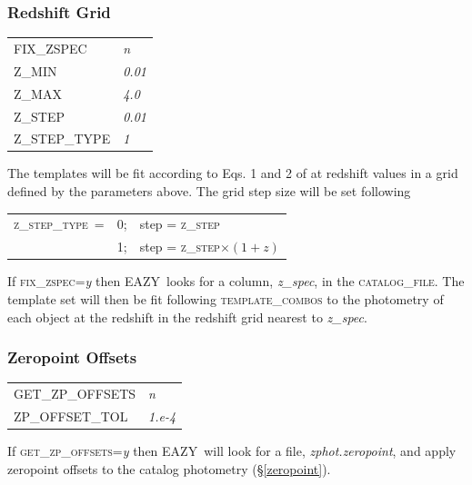 \documentclass[11pt]{article}
\newcommand{\eazy}{\textsc{EAZY}}
\begin{document}
\subsubsection{Redshift Grid}
\begin{tabular}{ll}
 \textsc{FIX\_ZSPEC     } & \textsl{       n                  } \\
 \textsc{Z\_MIN         } & \textsl{       0.01               } \\
 \textsc{Z\_MAX         } & \textsl{       4.0                } \\
 \textsc{Z\_STEP        } & \textsl{       0.01               } \\
 \textsc{Z\_STEP\_TYPE  } & \textsl{        1                 }
\end{tabular}

\vspace*{0.25cm}The templates will be fit according to Eqs. 1 and
2 of \cite{eazy_paper} at redshift values in a grid defined by the parameters above. 
The grid step size will be set following

\vspace*{0.25cm}\begin{tabular}{lcl}
\textsc{z\_step\_type}\ = & 0; & step = \textsc{z\_step} \\
 & 1; & step = \textsc{z\_step}$\times(1+z)$
\end{tabular}

\vspace*{0.25cm}If \textsc{fix\_zspec}=\textsl{y} then \eazy\ looks for a
column, \textsl{z\_spec}, in the \textsc{catalog\_file}.  The template set will
then be fit following \textsc{template\_combos} to the photometry of each
object at the redshift in the redshift grid nearest to \textsl{z\_spec}.


\subsubsection{Zeropoint Offsets}
\begin{tabular}{ll}
 \textsc{GET\_ZP\_OFFSETS   } & \textsl{    n                 } \\
 \textsc{ZP\_OFFSET\_TOL    } & \textsl{    1.e-4             } 
\end{tabular}

\vspace*{0.25cm} If \textsc{get\_zp\_offsets}=\textsl{y} then \eazy\ will look
for a file, \textit{zphot.zeropoint}, and apply zeropoint offsets to the
catalog photometry (\S\ref{zeropoint}).
\end{document}
